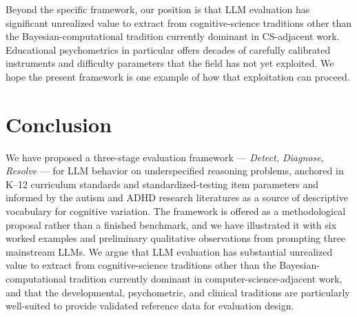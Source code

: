 \documentclass[11pt,letterpaper]{article}
\newcommand{\citeverify}[1]{{\color{orange}\textbf{[CITATION VERIFY:} #1\textbf{]}}}
\begin{document}
Beyond the specific framework, our position is that LLM evaluation has significant unrealized value to extract from cognitive-science traditions other than the Bayesian-computational tradition currently dominant in CS-adjacent work. Educational psychometrics in particular offers decades of carefully calibrated instruments and difficulty parameters that the field has not yet exploited. We hope the present framework is one example of how that exploitation can proceed.

\section{Conclusion}

We have proposed a three-stage evaluation framework --- \emph{Detect, Diagnose, Resolve} --- for LLM behavior on underspecified reasoning problems, anchored in K--12 curriculum standards and standardized-testing item parameters and informed by the autism and ADHD research literatures as a source of descriptive vocabulary for cognitive variation. The framework is offered as a methodological proposal rather than a finished benchmark, and we have illustrated it with six worked examples and preliminary qualitative observations from prompting three mainstream LLMs. We argue that LLM evaluation has substantial unrealized value to extract from cognitive-science traditions other than the Bayesian-computational tradition currently dominant in computer-science-adjacent work, and that the developmental, psychometric, and clinical traditions are particularly well-suited to provide validated reference data for evaluation design.

\end{document}
